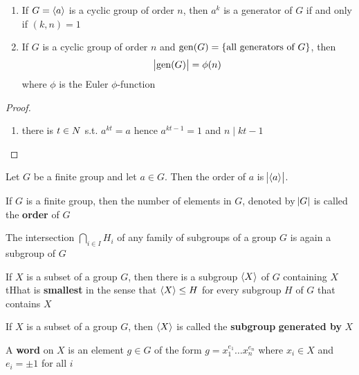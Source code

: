 \documentclass[11pt]{article}
\begin{document}
\begin{theorem}[]
\label{nthm1.39}
\begin{enumerate}
\item If \(G=\langle a\rangle\) is a cyclic group of order \(n\), then \(a^k\) is a generator
of \(G\) if and only if \((k,n)=1\)
\item If \(G\) is a cyclic group of order \(n\) and \(\operatorname{gen}(G)=\{\text{all generators
      of } G\}\), then
\begin{equation*}
\abs{\operatorname{gen}(G)}=\phi(n)
\end{equation*}
where \(\phi\) is the Euler \(\phi\)-function
\end{enumerate}
\end{theorem}
\begin{proof}
\begin{enumerate}
\item there is \(t\in\relax{N}\) s.t. \(a^{kt}=a\) hence \(a^{kt-1}=1\) and \(n\mid kt-1\)
\end{enumerate}
\end{proof}

\begin{proposition}[]
Let \(G\) be a finite group and let \(a\in G\). Then the order of \(a\) is
\(\abs{\langle a\rangle}\).
\end{proposition}

\begin{definition}[]
If \(G\) is a finite group, then the number of elements in \(G\), denoted by
\(\abs{G}\) is called the \textbf{order} of \(G\)
\end{definition}


\begin{proposition}[]
The intersection \(\bigcap_{i\in I}H_i\) of any family of subgroups of a group
\(G\) is again a subgroup of \(G\)
\end{proposition}


\begin{corollary}[]
If \(X\) is a subset of a group \(G\), then there is a subgroup \(\langle X\rangle\) of \(G\)
containing \(X\) tHhat is \textbf{smallest} in the sense that \(\langle X\rangle\le H\) for
every subgroup \(H\) 
of \(G\) that contains \(X\)
\end{corollary}


\begin{definition}[]
If \(X\) is a subset of a group \(G\), then \(\langle X\rangle\) is called the \textbf{subgroup}
\textbf{generated by} \(X\)
\end{definition}

A \textbf{word} on \(X\) is an element \(g\in G\) of the form \(g=x_1^{e_1}\dots
   x_n^{e_n}\) where \(x_i\in X\) and \(e_i=\pm 1\) for all \(i\)
\end{document}
